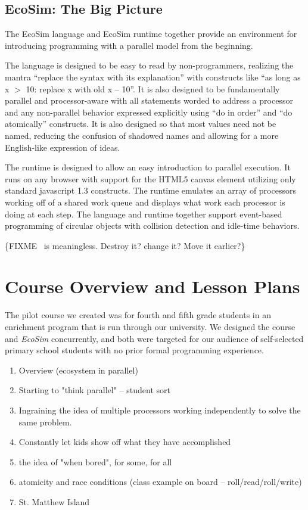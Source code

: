\documentclass{sig-alternate}
\newcommand{\FIXME}[1]{{\color{red}\{FIXME #1\}}}
\begin{document}
\subsection{EcoSim: The Big Picture}
The EcoSim language and EcoSim runtime together provide an environment 
for introducing programming with a parallel model from the beginning.

The language is designed to be easy to read by non-programmers, 
realizing the mantra ``replace the syntax with its explanation'' 
with constructs like ``as long as x $>$ 10: replace x with old x -- 10''.
It is also designed to be fundamentally parallel and processor-aware
with all statements worded to address a processor
and any non-parallel behavior expressed explicitly using ``do in order'' and ``do atomically'' constructs.
It is also designed so that most values need not be named,
reducing the confusion of shadowed names
and allowing for a more English-like expression of ideas.

The runtime is designed to allow an easy introduction to parallel execution.
It runs on any browser with support for the HTML5 canvas element utilizing only standard javascript 1.3 constructs.
The runtime emulates an array of processors working off of a shared work queue 
and displays what work each processor is doing at each step.
The language and runtime together support event-based programming of circular objects
with collision detection and idle-time behaviors.

\FIXME{\thesubsection\ is meaningless. Destroy it? change it? Move it earlier?}

\section{Course Overview and Lesson Plans}
The pilot course we created was for fourth and fifth grade students in an enrichment program
that is run through our university.  We designed the course and \emph{EcoSim} concurrently,
and both were targeted for our audience of self-selected primary school students with no
prior formal programming experience.
\begin{enumerate}
\item Overview (ecosystem in parallel)
\item Starting to "think parallel" -- student sort
\item Ingraining the idea of multiple processors working independently to solve the same problem.
\item Constantly let kids show off what they have accomplished
\item the idea of "when bored", for some, for all
\item atomicity and race conditions (class example on board -- roll/read/roll/write)
\item St. Matthew Island
\end{enumerate}
\end{document}
